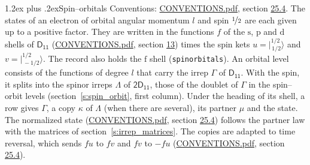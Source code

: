 \documentclass[10pt,a4paper]{article}
\makeatletter
\renewcommand\section{\@startsection{section}{1}{\z@}{-3ex plus -1ex minus -.2ex}%
  {1.2ex plus .2ex}{\normalfont\large\sffamily\bfseries\color{parttitle}}}
\numberwithin{equation}{section}
\newcommand{\grp}[1]{\mathsf{#1}}
\newcommand{\orbital}[1]{\mathrm{#1}}
\newcommand{\mult}{\kappa}
\newcommand{\intx}{\mu}
\newcommand{\jm}[2]{\bigl\lvert{}^{#1}_{\,#2}\bigr\rangle}
\makeatother
\begin{document}
\section{Spin--orbitals}\label{s:spin_orbitals}
Conventions: \href{../../CONVENTIONS.pdf}{CONVENTIONS.pdf}, section \href{../../CONVENTIONS.pdf\#conv.25.4}{25.4}.
\leavevmode\label{n:index.orbital.l}The states of an electron of orbital angular momentum $l$ and spin $\nicefrac{1}{2}$ are each given up to a positive factor. \label{n:local.spinor.uv}\label{n:local.function.f}They are written in the functions $f$ of the $\orbital{s}$, $\orbital{p}$ and $\orbital{d}$ shells of \href{../../../rotation/data/pdf/D11.pdf}{$\grp{D_{11}}$} (\href{../../CONVENTIONS.pdf}{CONVENTIONS.pdf}, section \href{../../../rotation/CONVENTIONS.pdf\#conv.13}{13}) times the spin kets $u = \jm{1/2}{1/2}$ and $v = \jm{1/2}{-1/2}$. The record also holds the $\orbital{f}$ shell (\texttt{spinorbitals}). An orbital level consists of the functions of degree $l$ that carry the irrep $\Gamma$ of \href{../../../rotation/data/pdf/D11.pdf}{$\grp{D_{11}}$}. With the spin, it splits into the spinor irreps $\Lambda$ of $\grp{2D_{11}}$, those of the doublet of $\Gamma$ in the spin--orbit levels (section~\ref{s:spin_orbit}, first column). \label{n:head.state}Under the heading of its shell, a row gives $\Gamma$, a copy $\mult$ of $\Lambda$ (when there are several), its partner $\intx$ and the state. The normalized state (\href{../../CONVENTIONS.pdf}{CONVENTIONS.pdf}, section \href{../../CONVENTIONS.pdf\#conv.25.4}{25.4}) follows the partner law with the matrices of section~\ref{s:irrep_matrices}. The copies are adapted to time reversal, which sends $f u$ to $f v$ and $f v$ to $-f u$ (\href{../../CONVENTIONS.pdf}{CONVENTIONS.pdf}, section \href{../../CONVENTIONS.pdf\#conv.25.4}{25.4}).
\end{document}
